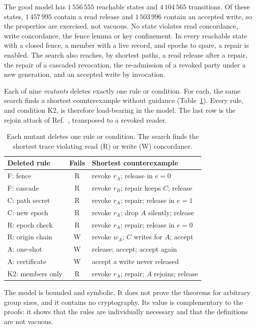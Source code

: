\documentclass[aps,prx,reprint,superscriptaddress,nofootinbib,floatfix]{revtex4-2}
\theoremstyle{remark}
\begin{document}
The good model has $1\,556\,555$ reachable states and $4\,104\,565$ transitions. Of these states, $1\,457\,995$ contain a read release and $1\,503\,996$ contain an accepted write, so the properties are exercised, not vacuous. No state violates read concordance, write concordance, the fence lemma or key confinement. In every reachable state with a closed fence, a member with a live record, and epochs to spare, a repair is enabled. The search also reaches, by shortest paths, a read release after a repair, the repair of a cascaded revocation, the re-admission of a revoked party under a new generation, and an accepted write by invocation.

Each of nine \emph{mutants} deletes exactly one rule or condition. For each, the same search finds a shortest counterexample without guidance (Table~\ref{tab:mutants}). Every rule, and condition K2, is therefore load-bearing in the model. The last row is the rejoin attack of Ref.~\cite{etk}, transposed to a revoked reader.

\begin{table}[t]
\caption{Each mutant deletes one rule or condition. The search finds the shortest trace violating read (R) or write (W) concordance.}
\label{tab:mutants}
\begin{ruledtabular}
\begin{tabular}{@{}l@{\;}c@{\;}l@{}}
Deleted rule & Fails & Shortest counterexample\\
\hline
F: fence & R & revoke $r_A$; release in $e{=}0$\\
F: cascade & R & revoke $r_B$; repair keeps $C$; release\\
C: path secret & R & revoke $r_A$; repair; release in $e{=}1$\\
C: new epoch & R & revoke $r_A$; drop $A$ silently; release\\
R: epoch check & R & revoke $r_A$; repair; release in $e{=}0$\\
R: origin chain & W & revoke $w_A$; $C$ writes for $A$; accept\\
A: one-shot & W & release; accept; accept again\\
A: certificate & W & accept a write never released\\
K2: members only & R & revoke $r_A$; repair; $A$ rejoins; release\\
\end{tabular}
\end{ruledtabular}
\end{table}

The model is bounded and symbolic. It does not prove the theorems for arbitrary group sizes, and it contains no cryptography. Its value is complementary to the proofs: it shows that the rules are individually necessary and that the definitions are not vacuous.
\end{document}

